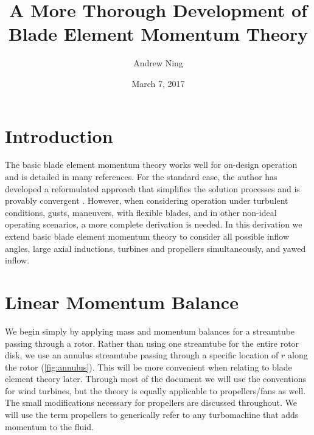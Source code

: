 \documentclass{article}
\begin{document}
\author{Andrew Ning}
\title{A More Thorough Development of\\Blade Element Momentum Theory}
\date{March 7, 2017}
\maketitle

\section{Introduction}

The basic blade element momentum theory works well for on-design operation and is detailed in many references.  For the standard case, the author has developed a reformulated approach that simplifies the solution processes and is provably convergent \cite{Ning2014-Simple-Solution}.  However, when considering operation under turbulent conditions, gusts, maneuvers, with flexible blades, and in other non-ideal operating scenarios, a more complete derivation is needed.  In this derivation we extend basic blade element momentum theory to consider all possible inflow angles, large axial inductions, turbines and propellers simultaneously, and yawed inflow.

\section{Linear Momentum Balance}

We begin simply by applying mass and momentum balances for a streamtube passing through a rotor.  Rather than using one streamtube for the entire rotor disk, we use an annulus streamtube passing through a specific location of $r$ along the rotor (\cref{fig:annulus}). This will be more convenient when relating to blade element theory later.  Through most of the document we will use the conventions for wind turbines, but the theory is equally applicable to propellers/fans as well.  The small modifications necessary for propellers are discussed throughout.  We will use the term propellers to generically refer to any turbomachine that adds momentum to the fluid.
\end{document}
